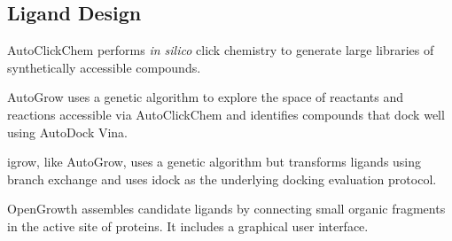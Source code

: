 \subsection*{Ligand Design}

AutoClickChem \cite{Durrant_2012} performs \textit{in silico} click chemistry to generate large libraries of synthetically accessible compounds.

AutoGrow \cite{Durrant_2013} uses a genetic algorithm to explore the space of reactants and reactions accessible via AutoClickChem and identifies compounds that dock well using AutoDock Vina.

igrow, like AutoGrow, uses a genetic algorithm but transforms ligands using branch exchange and uses idock as the underlying docking evaluation protocol.

OpenGrowth  \cite{Ch_ron_2015}  assembles candidate ligands by connecting small organic fragments in the active site of proteins.  It includes a graphical user interface.

